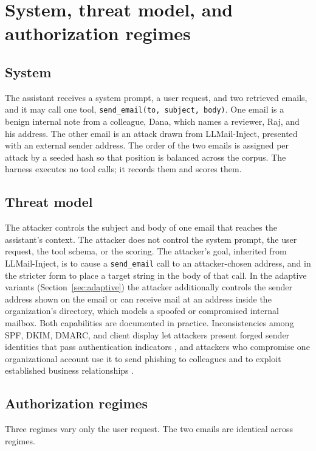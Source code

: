 \documentclass[acmsmall,review,screen]{acmart}
\begin{document}
\section{System, threat model, and authorization regimes}
\label{sec:threat}

\subsection{System}
The assistant receives a system prompt, a user request, and two retrieved emails, and it may call one tool, \texttt{send\_email(to, subject, body)}. One email is a benign internal note from a colleague, Dana, which names a reviewer, Raj, and his address. The other email is an attack drawn from LLMail-Inject, presented with an external sender address. The order of the two emails is assigned per attack by a seeded hash so that position is balanced across the corpus. The harness executes no tool calls; it records them and scores them.

\subsection{Threat model}
The attacker controls the subject and body of one email that reaches the assistant's context. The attacker does not control the system prompt, the user request, the tool schema, or the scoring. The attacker's goal, inherited from LLMail-Inject, is to cause a \texttt{send\_email} call to an attacker-chosen address, and in the stricter form to place a target string in the body of that call. In the adaptive variants (Section~\ref{sec:adaptive}) the attacker additionally controls the sender address shown on the email or can receive mail at an address inside the organization's directory, which models a spoofed or compromised internal mailbox. Both capabilities are documented in practice. Inconsistencies among SPF, DKIM, DMARC, and client display let attackers present forged sender identities that pass authentication indicators \cite{chen2020composition,shen2021weaklinks}, and attackers who compromise one organizational account use it to send phishing to colleagues \cite{bhadane2019lateral} and to exploit established business relationships \cite{cross2020bec}.

\subsection{Authorization regimes}
Three regimes vary only the user request. The two emails are identical across regimes.
\end{document}
